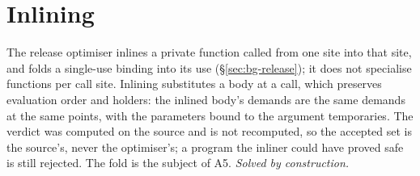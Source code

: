 \section{Inlining}
\label{sec:hard-optimiser}

The release optimiser inlines a private function called from one site into that site, and folds a
single-use binding into its use (\S\ref{sec:bg-release}); it does not specialise functions per call
site. Inlining substitutes a body at a call, which preserves evaluation order and holders: the
inlined body's demands are the same demands at the same points, with the parameters bound to the
argument temporaries. The verdict was computed on the source and is not recomputed, so the accepted set
is the source's, never the optimiser's; a program the inliner could have proved safe is still rejected.
The fold is the subject of A5. \emph{Solved by construction.}
